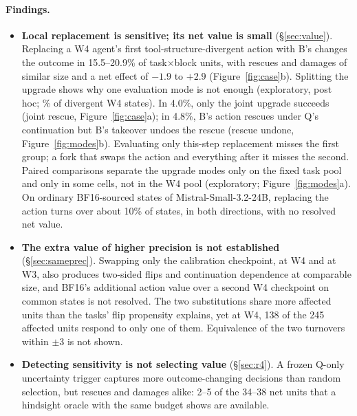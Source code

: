 \paragraph{Findings.}
\begin{itemize}[leftmargin=*,itemsep=1pt,topsep=2pt]
\item \textbf{Local replacement is sensitive; its net value is small} (\S\ref{sec:value}). Replacing a W4 agent's first tool-structure-divergent action with B's changes the outcome in 15.5--20.9\% of task$\times$block units, with rescues and damages of similar size and a net effect of $-1.9$ to $+2.9$\pp{} (Figure~\ref{fig:case}b). Splitting the upgrade shows why one evaluation mode is not enough (exploratory, post hoc; \% of divergent W4 states). In 4.0\%, only the joint upgrade succeeds (joint rescue, Figure~\ref{fig:case}a); in 4.8\%, B's action rescues under Q's continuation but B's takeover undoes the rescue (rescue undone, Figure~\ref{fig:modes}b). Evaluating only this-step replacement misses the first group; a fork that swaps the action and everything after it misses the second. Paired comparisons separate the upgrade modes only on the fixed task pool and only in some cells, not in the W4 pool (exploratory; Figure~\ref{fig:modes}a). On ordinary BF16-sourced states of Mistral-Small-3.2-24B, replacing the action turns over about 10\% of states, in both directions, with no resolved net value. %
\item \textbf{The extra value of higher precision is not established} (\S\ref{sec:sameprec}). Swapping only the calibration checkpoint, at W4 and at W3, also produces two-sided flips and continuation dependence at comparable size, and BF16's additional action value over a second W4 checkpoint on common states is not resolved. The two substitutions share more affected units than the tasks' flip propensity explains, yet at W4, 138 of the 245 affected units respond to only one of them. Equivalence of the two turnovers within $\pm$3\pp{} is not shown. %
\item \textbf{Detecting sensitivity is not selecting value} (\S\ref{sec:r4}). A frozen Q-only uncertainty trigger captures more outcome-changing decisions than random selection, but rescues and damages alike: 2--5 of the 34--38 net units that a hindsight oracle with the same budget shows are available. %
\end{itemize}

